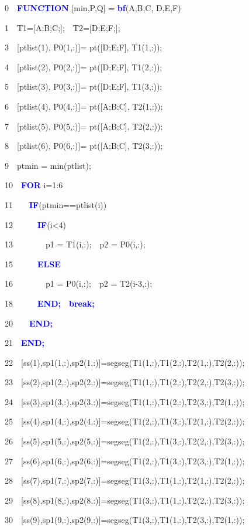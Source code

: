 \documentclass[times,12pt]{article}
\begin{document}
\begin{algorithm}
0~~\textbf{\textcolor{blue}{FUNCTION}} [min,P,Q] = \textbf{\textcolor{blue}{bf}}(A,B,C, D,E,F)

1~~T1=[A;B;C;];~~T2=[D;E;F;];

3~~[ptlist(1), P0(1,:)]= pt([D;E;F], T1(1,:));

4~~[ptlist(2), P0(2,:)]= pt([D;E;F], T1(2,:));

5~~[ptlist(3), P0(3,:)]= pt([D;E;F], T1(3,:));

6~~[ptlist(4), P0(4,:)]= pt([A;B;C], T2(1,:));

7~~[ptlist(5), P0(5,:)]= pt([A;B;C], T2(2,:));

8~~[ptlist(6), P0(6,:)]= pt([A;B;C], T2(3,:));

9~~ptmin = min(ptlist);

10~~\textbf{\textcolor{blue}{FOR}} i=1:6

11~~~~\textbf{\textcolor{blue}{IF}}(ptmin==ptlist(i))

12~~~~~~\textbf{\textcolor{blue}{IF}}(i<4)

13~~~~~~~~p1 = T1(i,:);~~p2 = P0(i,:);

15~~~~~~\textbf{\textcolor{blue}{ELSE}}

16~~~~~~~~p1 = P0(i,:);~~p2 = T2(i-3,:);

18~~~~~~\textbf{\textcolor{blue}{END;}}~~\textbf{\textcolor{blue}{break;}}

20~~~~\textbf{\textcolor{blue}{END;}}

21~~\textbf{\textcolor{blue}{END;}}

22~~[ss(1),sp1(1,:),sp2(1,:)]=segseg(T1(1,:),T1(2,:),T2(1,:),T2(2,:));

23~~[ss(2),sp1(2,:),sp2(2,:)]=segseg(T1(1,:),T1(2,:),T2(2,:),T2(3,:));

24~~[ss(3),sp1(3,:),sp2(3,:)]=segseg(T1(1,:),T1(2,:),T2(3,:),T2(1,:));

25~~[ss(4),sp1(4,:),sp2(4,:)]=segseg(T1(2,:),T1(3,:),T2(1,:),T2(2,:));

26~~[ss(5),sp1(5,:),sp2(5,:)]=segseg(T1(2,:),T1(3,:),T2(2,:),T2(3,:));

27~~[ss(6),sp1(6,:),sp2(6,:)]=segseg(T1(2,:),T1(3,:),T2(3,:),T2(1,:));

28~~[ss(7),sp1(7,:),sp2(7,:)]=segseg(T1(3,:),T1(1,:),T2(1,:),T2(2,:));

29~~[ss(8),sp1(8,:),sp2(8,:)]=segseg(T1(3,:),T1(1,:),T2(2,:),T2(3,:));

30~~[ss(9),sp1(9,:),sp2(9,:)]=segseg(T1(3,:),T1(1,:),T2(3,:),T2(1,:));


\end{algorithm}
\end{document}
